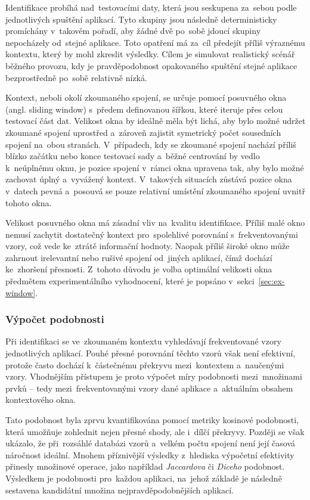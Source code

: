 Identifikace probíhá nad~testovacími daty, která jsou seskupena za~sebou podle jednotlivých spuštění aplikací. Tyto skupiny jsou následně deterministicky promíchány v~takovém pořadí, aby žádné dvě po~sobě jdoucí skupiny nepocházely od~stejné aplikace. Toto opatření má za~cíl předejít příliš výraznému kontextu, který by mohl zkreslit výsledky. Cílem je simulovat realistický scénář běžného provozu, kdy je pravděpodobnost opakovaného spuštění stejné aplikace bezprostředně po~sobě relativně nízká.

Kontext, neboli okolí zkoumaného spojení, se určuje pomocí posuvného okna (angl. sliding window) s~předem definovanou šířkou, které iteruje přes celou testovací část dat. Velikost okna by ideálně měla být lichá, aby bylo možné udržet zkoumané spojení uprostřed a~zároveň zajistit symetrický počet sousedních spojení na~obou stranách. V~případech, kdy se zkoumané spojení nachází příliš blízko začátku nebo konce testovací sady a~běžné centrování by vedlo k~neúplnému oknu, je pozice spojení v~rámci okna upravena tak, aby bylo možné zachovat úplný a~vyvážený kontext. V~takových situacích zůstává pozice okna v~datech pevná a~posouvá se pouze relativní umístění zkoumaného spojení uvnitř tohoto okna.

Velikost posuvného okna má zásadní vliv na~kvalitu identifikace. Příliš malé okno nemusí zachytit dostatečný kontext pro~spolehlivé porovnání s~frekventovanými vzory, což vede ke~ztrátě informační hodnoty. Naopak příliš široké okno může zahrnout irelevantní nebo rušivé spojení od~jiných aplikací, čímž dochází ke~zhoršení přesnosti. Z~tohoto důvodu je volba optimální velikosti okna předmětem experimentálního vyhodnocení, které je popsáno v~sekci~\ref{sec:ex-window}.

\subsubsection{Výpočet podobnosti}
Při identifikaci se ve~zkoumaném kontextu vyhledávají frekventované vzory jednotlivých aplikací. Pouhé přesné porovnání těchto vzorů však není efektivní, protože často dochází k~částečnému překryvu mezi~kontextem a~naučenými vzory. Vhodnějším přístupem je proto výpočet míry podobnosti mezi~množinami prvků -- tedy mezi~frekventovanými vzory dané aplikace a~aktuálním obsahem kontextového okna.

Tato podobnost byla zprvu kvantifikována pomocí metriky kosinové podobnosti, která umožňuje zohlednit nejen přesné shody, ale i~dílčí překryvy. Později se však ukázalo, že při~rozsáhlé databázi vzorů a~velkém počtu spojení není její časová náročnost ideální. Mnohem příznivější výsledky z~hlediska výpočetní efektivity přinesly množinové operace, jako například \textit{Jaccardova} či \textit{Diceho} podobnost. Výsledkem je  podobnosti pro~každou aplikaci, na~jehož základě je následně sestavena kandidátní množina nejpravděpodobnějších aplikací.

